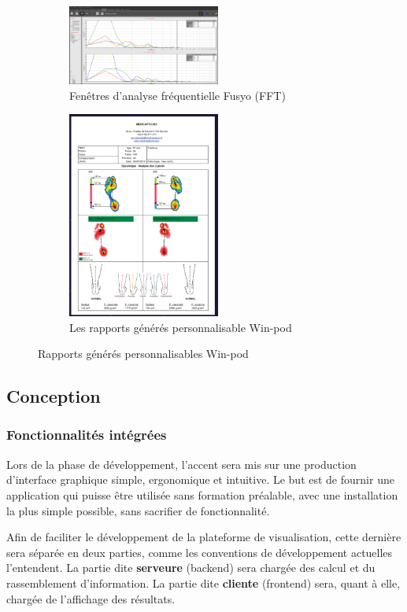 \begin{figure}[H]
    \centering
    \begin{subfigure}[b]{0.45\textwidth}
      \centering
      \includegraphics[width=5cm]{images/analyse_marche/FFT.png}
      \caption{Fenêtres d’analyse fréquentielle Fusyo (FFT)}\label{fig:FFT}
    \end{subfigure}
    \begin{subfigure}[b]{0.45\textwidth}
      \centering
      \includegraphics[width=5cm]{images/analyse_marche/WinPod4.png}
    \caption{Les rapports générés personnalisable Win-pod}\label{fig:WinPod4}
    \end{subfigure}
    \caption{Rapports générés personnalisables Win-pod}\label{fig:global2}
\end{figure}


\subsection{Conception}

\subsubsection{Fonctionnalités intégrées}
Lors de la phase de développement, l'accent sera mis sur une production d'interface graphique simple, ergonomique et intuitive.
Le but est de fournir une application qui puisse être utilisée sans formation préalable, avec une installation la plus simple possible, sans sacrifier de fonctionnalité.

Afin de faciliter le développement de la plateforme de visualisation, cette dernière sera séparée en deux parties, comme les conventions de développement actuelles l'entendent. 
La partie dite \textbf{serveure} (backend) sera chargée des calcul et du rassemblement d'information. 
La partie dite \textbf{cliente} (frontend) sera, quant à elle, chargée de l'affichage des résultats.

